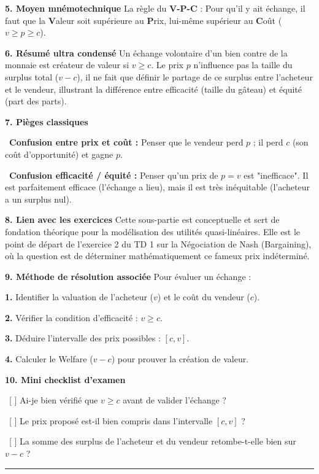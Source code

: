 \documentclass[11pt, a4paper]{report}
\begin{document}
\textbf{5. Moyen mnémotechnique}
La règle du \textbf{V-P-C} : Pour qu'il y ait échange, il faut que la \textbf{V}aleur soit supérieure au \textbf{P}rix, lui-même supérieur au \textbf{C}oût ($v \ge p \ge c$).

\textbf{6. Résumé ultra condensé}
Un échange volontaire d'un bien contre de la monnaie est créateur de valeur si $v \ge c$. Le prix $p$ n'influence pas la taille du surplus total ($v-c$), il ne fait que définir le partage de ce surplus entre l'acheteur et le vendeur, illustrant la différence entre efficacité (taille du gâteau) et équité (part des parts).

\textbf{7. Pièges classiques}
\par \textbullet\ \textbf{Confusion entre prix et coût :} Penser que le vendeur perd $p$ ; il perd $c$ (son coût d'opportunité) et gagne $p$.
\par \textbullet\ \textbf{Confusion efficacité / équité :} Penser qu'un prix de $p = v$ est "inefficace". Il est parfaitement efficace (l'échange a lieu), mais il est très inéquitable (l'acheteur a un surplus nul).

\textbf{8. Lien avec les exercices}
Cette sous-partie est conceptuelle et sert de fondation théorique pour la modélisation des utilités quasi-linéaires. Elle est le point de départ de l'exercice 2 du TD 1 sur la Négociation de Nash (Bargaining), où la question est de déterminer mathématiquement ce fameux prix indéterminé.

\textbf{9. Méthode de résolution associée}
Pour évaluer un échange :
\par \textbf{1.} Identifier la valuation de l'acheteur ($v$) et le coût du vendeur ($c$).
\par \textbf{2.} Vérifier la condition d'efficacité : $v \ge c$.
\par \textbf{3.} Déduire l'intervalle des prix possibles : $[c, v]$.
\par \textbf{4.} Calculer le Welfare ($v - c$) pour prouver la création de valeur.

\textbf{10. Mini checklist d'examen}
\par \textbullet\ [ ] Ai-je bien vérifié que $v \ge c$ avant de valider l'échange ?
\par \textbullet\ [ ] Le prix proposé est-il bien compris dans l'intervalle $[c, v]$ ?
\par \textbullet\ [ ] La somme des surplus de l'acheteur et du vendeur retombe-t-elle bien sur $v-c$ ?

\vspace{1cm}\hrule\vspace{1cm}
\end{document}
